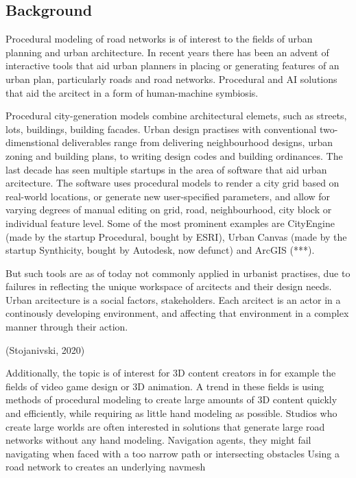 \documentclass[a4paper]{article}
\begin{document}
\subsection{Background}

Procedural modeling of road networks is of interest to the fields of urban planning and urban architecture. In recent years there has been an advent of interactive tools that aid urban planners in placing or generating features of an urban plan, particularly roads and road networks. Procedural and AI solutions that aid the arcitect in a form of human-machine symbiosis.

Procedural city-generation models combine architectural elemets, such as streets, lots, buildings, building facades.
Urban design practises with conventional two-dimenstional deliverables range from delivering neighbourhood designs, urban zoning and building plans, to writing design codes and building ordinances.
The last decade has seen multiple startups in the area of software that aid urban arcitecture. The software uses procedural models to render a city grid based on real-world locations, or generate new user-specified parameters, and allow for varying degrees of manual editing on grid, road, neighbourhood, city block or individual feature level.
Some of the most prominent examples are CityEngine (made by the startup Procedural, bought by ESRI), Urban Canvas (made by the startup Synthicity, bought by Autodesk, now defunct) and ArcGIS (***).

But such tools are as of today not commonly applied in urbanist practises, due to failures in reflecting the unique workspace of arcitects and their design needs. Urban arcitecture is a social factors, stakeholders. Each arcitect is an actor in a continously developing environment, and affecting that environment in a complex manner through their action.

(Stojanivski, 2020)

Additionally, the topic is of interest for 3D content creators in for example the fields of video game design or 3D animation. A trend in these fields is using methods of procedural modeling to create large amounts of 3D content quickly and efficiently, while requiring as little hand modeling as possible. Studios who create large worlds are often interested in solutions that generate large road networks without any hand modeling.
Navigation agents, they might fail navigating when faced with a too narrow path or intersecting obstacles
Using a road network to creates an underlying navmesh
\end{document}
